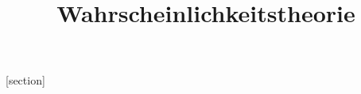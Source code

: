 \documentclass{mycourse}
\begin{document}
\title{Wahrscheinlichkeitstheorie}

\maketitle

\tableofcontents

\setcounter{chapter}{-1}
[section]


\end{document}
